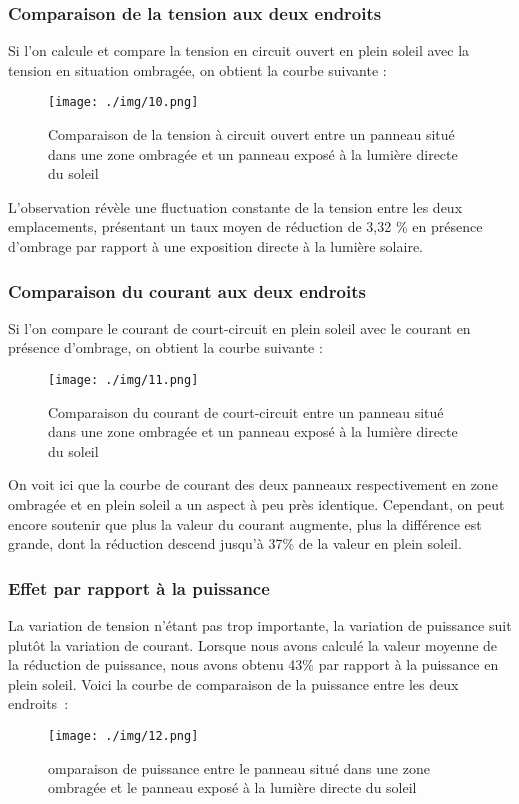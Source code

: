 \subsubsection{Comparaison de la tension aux deux endroits}

Si l’on calcule et compare la tension en circuit ouvert en plein soleil avec la tension en situation ombragée, on obtient la courbe suivante :
\begin{figure}[H]
	\centering
	\texttt{[image: ./img/10.png]}
	\caption{Comparaison de la tension à circuit ouvert entre un panneau situé dans une zone ombragée et un panneau exposé à la lumière directe du soleil}
\end{figure}

L'observation révèle une fluctuation constante de la tension entre les deux emplacements, présentant un taux moyen de réduction de 3,32 \% en présence d'ombrage par rapport à une exposition directe à la lumière solaire. 

\subsubsection{Comparaison du courant aux deux endroits}
Si l’on compare le courant de court-circuit en plein soleil avec le courant en présence d’ombrage, on obtient la courbe suivante :
\begin{figure}[H]
	\centering
	\texttt{[image: ./img/11.png]}
	\caption{Comparaison du courant de court-circuit entre un panneau situé dans une zone ombragée et un panneau exposé à la lumière directe du soleil
}
	
\end{figure}

On voit ici que la courbe de courant des deux panneaux respectivement en zone ombragée et en plein soleil a un aspect à peu près identique. Cependant, on peut encore soutenir que plus la valeur du courant augmente, plus la différence est grande, dont la réduction descend jusqu'à 37\% de la valeur en plein soleil.

\subsubsection{Effet par rapport à la puissance}
La variation de tension n’étant pas trop importante, la variation de puissance suit plutôt la variation de courant. Lorsque nous avons calculé la valeur moyenne de la réduction de puissance, nous avons obtenu 43\% par rapport à la puissance en plein soleil. Voici la courbe de comparaison de la puissance entre les deux endroits :
\begin{figure}[H]
	\centering
	\texttt{[image: ./img/12.png]}
	\caption{omparaison de puissance entre le panneau situé dans une zone ombragée et le panneau exposé à la lumière directe du soleil}
\end{figure}

